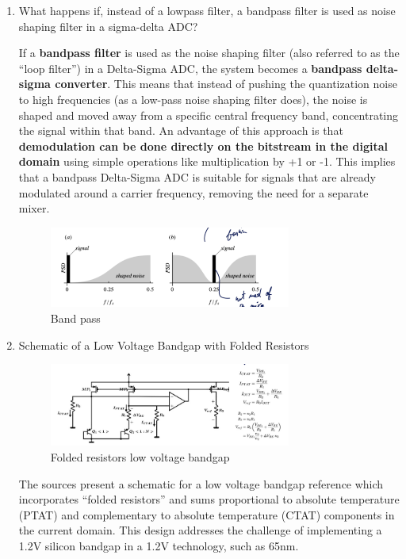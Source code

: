 \documentclass[
  a4paper,
]{article}
\begin{document}
\begin{enumerate}
\def\labelenumi{\arabic{enumi}.}
\setcounter{enumi}{19}
\item
  What happens if, instead of a lowpass filter, a bandpass filter is
  used as noise shaping filter in a sigma-delta ADC?

  If a \textbf{bandpass filter} is used as the noise shaping filter
  (also referred to as the ``loop filter'') in a Delta-Sigma ADC, the
  system becomes a \textbf{bandpass delta-sigma converter}. This means
  that instead of pushing the quantization noise to high frequencies (as
  a low-pass noise shaping filter does), the noise is shaped and moved
  away from a specific central frequency band, concentrating the signal
  within that band. An advantage of this approach is that
  \textbf{demodulation can be done directly on the bitstream in the
  digital domain} using simple operations like multiplication by +1 or
  -1. This implies that a bandpass Delta-Sigma ADC is suitable for
  signals that are already modulated around a carrier frequency,
  removing the need for a separate mixer.

  \begin{figure}
  \centering
  \includegraphics[width=0.75\textwidth,height=\textheight]{image-6.png}
  \caption{Band pass}
  \end{figure}
\item
  Schematic of a Low Voltage Bandgap with Folded Resistors

  \begin{figure}
  \centering
  \includegraphics[width=0.75\textwidth,height=\textheight]{image-8.png}
  \caption{Folded resistors low voltage bandgap}
  \end{figure}

  The sources present a schematic for a low voltage bandgap reference
  which incorporates ``folded resistors'' and sums proportional to
  absolute temperature (PTAT) and complementary to absolute temperature
  (CTAT) components in the current domain. This design addresses the
  challenge of implementing a 1.2V silicon bandgap in a 1.2V technology,
  such as 65nm.


\end{enumerate}
\end{document}
